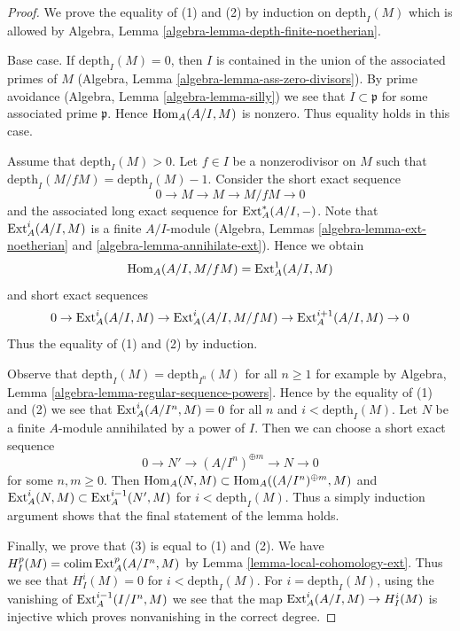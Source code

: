 \begin{proof}
We prove the equality of (1) and (2) by induction on $\text{depth}_I(M)$
which is allowed by
Algebra, Lemma \ref{algebra-lemma-depth-finite-noetherian}.

\medskip\noindent
Base case. If $\text{depth}_I(M) = 0$, then $I$ is contained in the union
of the associated primes of $M$
(Algebra, Lemma \ref{algebra-lemma-ass-zero-divisors}).
By prime avoidance (Algebra, Lemma \ref{algebra-lemma-silly})
we see that $I \subset \mathfrak p$ for some associated prime $\mathfrak p$.
Hence $\mathop{\mathrm{Hom}}\nolimits_A(A/I, M)$
is nonzero. Thus equality holds in this case.

\medskip\noindent
Assume that $\text{depth}_I(M) > 0$. Let $f \in I$ be a nonzerodivisor
on $M$ such that $\text{depth}_I(M/fM) = \text{depth}_I(M) - 1$.
Consider the short exact sequence
$$
0 \to M \to M \to M/fM \to 0
$$
and the associated long exact sequence for $\mathop{\mathrm{Ext}}\nolimits^*_A(A/I, -)$.
Note that $\mathop{\mathrm{Ext}}\nolimits^i_A(A/I, M)$ is a finite $A/I$-module
(Algebra, Lemmas \ref{algebra-lemma-ext-noetherian} and
\ref{algebra-lemma-annihilate-ext}). Hence we obtain
$$
\mathop{\mathrm{Hom}}\nolimits_A(A/I, M/fM) = \mathop{\mathrm{Ext}}\nolimits^1_A(A/I, M)
$$
and short exact sequences
$$
0 \to \mathop{\mathrm{Ext}}\nolimits^i_A(A/I, M) \to \text{Ext}^i_A(A/I, M/fM) \to
\mathop{\mathrm{Ext}}\nolimits^{i + 1}_A(A/I, M) \to 0
$$
Thus the equality of (1) and (2) by induction.

\medskip\noindent
Observe that $\text{depth}_I(M) = \text{depth}_{I^n}(M)$ for all $n \geq 1$
for example by Algebra, Lemma \ref{algebra-lemma-regular-sequence-powers}.
Hence by the equality of (1) and (2) we see that
$\mathop{\mathrm{Ext}}\nolimits^i_A(A/I^n, M) = 0$ for all $n$ and $i < \text{depth}_I(M)$.
Let $N$ be a finite $A$-module annihilated by a power of $I$.
Then we can choose a short exact sequence
$$
0 \to N' \to (A/I^n)^{\oplus m} \to N \to 0
$$
for some $n, m \geq 0$. Then
$\mathop{\mathrm{Hom}}\nolimits_A(N, M) \subset \mathop{\mathrm{Hom}}\nolimits_A((A/I^n)^{\oplus m}, M)$
and
$\mathop{\mathrm{Ext}}\nolimits^i_A(N, M) \subset \text{Ext}^{i - 1}_A(N', M)$
for $i < \text{depth}_I(M)$. Thus a simply induction argument
shows that the final statement of the lemma holds.

\medskip\noindent
Finally, we prove that (3) is equal to (1) and (2).
We have $H^p_I(M) = \mathop{\mathrm{colim}}\nolimits \mathop{\mathrm{Ext}}\nolimits^p_A(A/I^n, M)$ by
Lemma \ref{lemma-local-cohomology-ext}.
Thus we see that $H^i_I(M) = 0$ for $i < \text{depth}_I(M)$.
For $i = \text{depth}_I(M)$, using the vanishing of
$\mathop{\mathrm{Ext}}\nolimits_A^{i - 1}(I/I^n, M)$ we see that the map
$\mathop{\mathrm{Ext}}\nolimits_A^i(A/I, M) \to H_I^i(M)$ is injective which
proves nonvanishing in the correct degree.
\end{proof}

